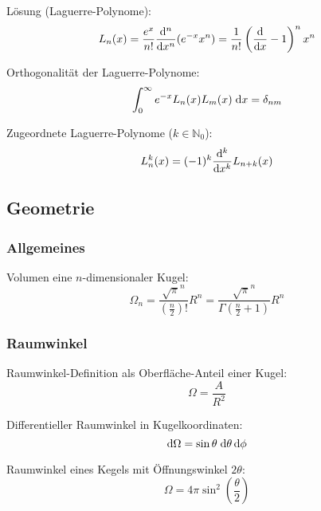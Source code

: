 \documentclass[11pt]{article}
\numberwithin{equation}{section}
\begin{document}
				\noindent
				Lösung (Laguerre-Polynome):
				\begin{equation}
					L_n(x) = \frac{e^x}{n!}\frac{\mathrm{d}^n}{\mathrm{d} x^n}(e^{-x} x^n) = \frac{1}{n!} \left(\frac{\mathrm{d} }{\mathrm{d} x}-1\right)^n x^n
				\end{equation}

				\noindent
				Orthogonalität der Laguerre-Polynome:
				\begin{equation}
					\int_0^\infty e^{-x} L_n(x) L_m(x)\;\mathrm{d} x = \delta_{nm}
				\end{equation}

				\noindent
				Zugeordnete Laguerre-Polynome ($k\in\mathbb{N}_0$):
				\begin{equation}
					L_n^k(x) = (-1)^k\frac{\mathrm{d}^k}{\mathrm{d} x^k} L_{n+k}(x)
				\end{equation}

		\subsection{Geometrie}
			\subsubsection{Allgemeines}
				\noindent
				Volumen eine $n$-dimensionaler Kugel:
				\begin{equation}
					\Omega_n = \frac{\sqrt{\pi}^n}{\left(\frac{n}{2}\right)!}R^n
					= \frac{\sqrt{\pi}^n}{\Gamma\left(\frac{n}{2}+1\right)}R^n
				\end{equation}


			\subsubsection{Raumwinkel}
				\noindent
				Raumwinkel-Definition als Oberfläche-Anteil einer Kugel:
				\begin{equation}
					\Omega = \frac{A}{R^2}
				\end{equation}

				\noindent
				Differentieller Raumwinkel in Kugelkoordinaten:
				\begin{equation}
					\mathrm{d} \Omega = \sin\theta\;\mathrm{d} \theta \,\mathrm{d} \phi
				\end{equation}

				\noindent
				Raumwinkel eines Kegels mit Öffnungswinkel $2\theta$:
				\begin{equation}
					\Omega = 4\pi\sin^2\left(\frac{\theta}{2}\right)
				\end{equation}
\end{document}
